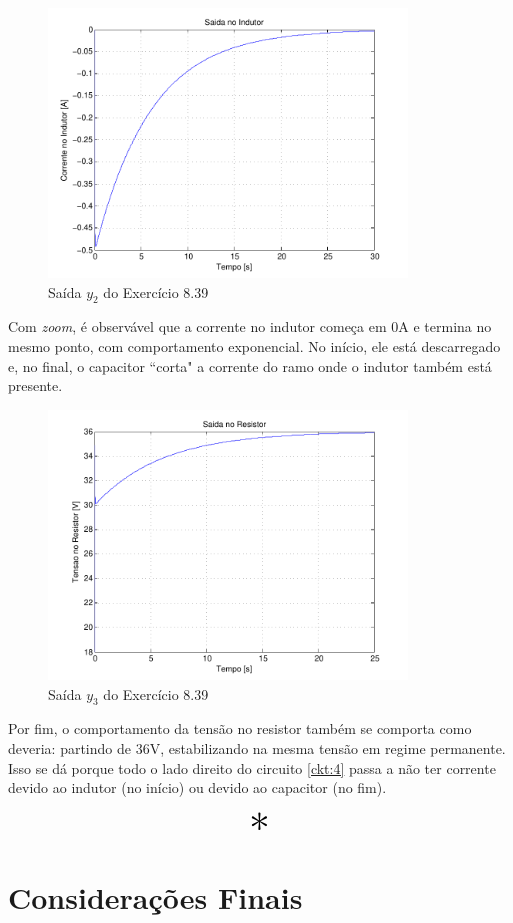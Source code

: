 \documentclass{report}
\let\oldsection\section
\renewcommand\section{\clearpage\oldsection}
\begin{document}
\clearpage
\begin{figure}[h!]
    \centering
    \includegraphics[width=0.85\textwidth]{images/plots/plot_8_39_y2.pdf}
    \caption{\label{plot:8.39_y2} Saída $ y_2 $ do Exercício 8.39}
\end{figure}

Com \textit{zoom}, é observável que a corrente no indutor começa em $ 0\text{A} $ e termina no mesmo ponto, com comportamento
exponencial. No início, ele está descarregado e, no final, o capacitor ``corta" a corrente do ramo onde o
indutor também está presente.

\begin{figure}[h!]
    \centering
    \includegraphics[width=0.85\textwidth]{images/plots/plot_8_39_y3.pdf}
    \caption{\label{plot:8.39_y3} Saída $ y_3 $ do Exercício 8.39}
\end{figure}

Por fim, o comportamento da tensão no resistor também se comporta como deveria: partindo de $ 36\text{V} $, estabilizando
na mesma tensão em regime permanente. Isso se dá porque todo o lado direito do circuito \ref{ckt:4} passa a não ter corrente devido ao indutor (no início)
ou devido ao capacitor (no fim).
\vspace*{-\baselineskip}
\begin{center}
    \[ \scalebox{3}{$ * $} \]
\end{center}

\section{Considerações Finais}
\end{document}
